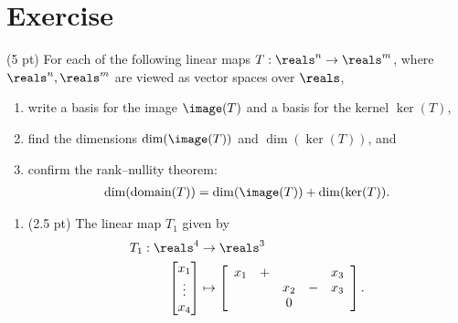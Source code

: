 %
%
\section{Exercise}

(5 pt) For each of the following linear maps $T : \reals^{n} \rightarrow \reals^{m}$, where $\reals^{n},\reals^{m}$ are viewed as vector spaces over $\reals$,
\begin{enumerate}[label=(\roman*)]
\item write a basis for the image $\image(T)$ and a basis for the kernel $\ker(T)$,
\item find the dimensions $\dim(\image(T))$ and $\dim(\ker(T))$, and
\item confirm the rank--nullity theorem:
\begin{align*}
\dim(\text{domain}(T))
=
\dim(\image(T))
+
\dim(\ker(T)).
\end{align*}
\end{enumerate}
\begin{enumerate}[label=(\alph*)]
\item\label{itm : Quiz17a} (2.5 pt) The linear map $T_{1}$ given by
\begin{align*}
T_{1}
:
\reals^{4}
&\rightarrow
\reals^{3}
\\
\begin{bmatrix}
x_{1}		\\
\vdots	\\
x_{4}
\end{bmatrix}
&\mapsto
\left[
\begin{array}{c c c c c c c}
x_{1}	&	+	&		&		&	x_{3}	\\
	&		&	x_{2}	&	-	&	x_{3}	\\
	&		&	0	&		&	
\end{array}
\right].
\end{align*}
\end{enumerate}

